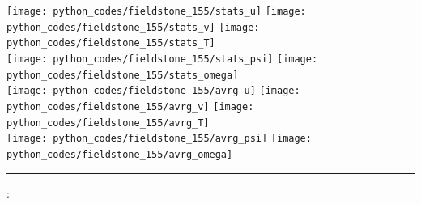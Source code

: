 \newpage
\begin{center}
\texttt{[image: python\_codes/fieldstone\_155/stats\_u]}
\texttt{[image: python\_codes/fieldstone\_155/stats\_v]}
\texttt{[image: python\_codes/fieldstone\_155/stats\_T]}\\
\texttt{[image: python\_codes/fieldstone\_155/stats\_psi]}
\texttt{[image: python\_codes/fieldstone\_155/stats\_omega]}\\
\texttt{[image: python\_codes/fieldstone\_155/avrg\_u]}
\texttt{[image: python\_codes/fieldstone\_155/avrg\_v]}
\texttt{[image: python\_codes/fieldstone\_155/avrg\_T]}\\
\texttt{[image: python\_codes/fieldstone\_155/avrg\_psi]}
\texttt{[image: python\_codes/fieldstone\_155/avrg\_omega]}
\end{center}


\par\noindent\rule{\textwidth}{0.4pt}

\vspace{.5cm}

\begin{center}
\end{center}

\vspace{.5cm}

\Literature:\\



